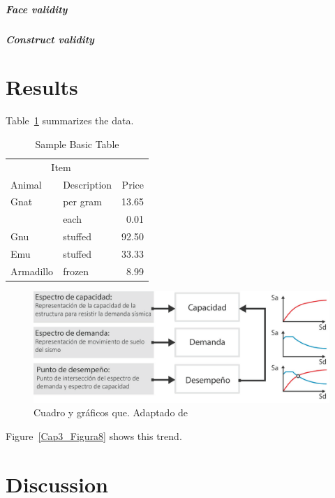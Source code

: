\documentclass[doc, 12pt, a4paper, draftall]{apa7} %
\begin{document}
\subparagraph{Face validity}
\lipsum[13]

\subparagraph{Construct validity}
\lipsum[14]

\section{Results}
Table~\ref{tab:BasicTable} summarizes the data. \lipsum[15]

\begin{table}
  \caption{Sample Basic Table}
  \label{tab:BasicTable}
  \begin{tabular}{@{}llr@{}}         \toprule
  \multicolumn{2}{c}{Item}        \\ \cmidrule(r){1-2}
  Animal    & Description & Price \\ \midrule
  Gnat      & per gram    & 13.65 \\
            & each        &  0.01 \\
  Gnu       & stuffed     & 92.50 \\
  Emu       & stuffed     & 33.33 \\
  Armadillo & frozen      &  8.99 \\ \bottomrule
  \end{tabular}
\end{table}

\begin{figure}[!ht]
	\centering
  \includegraphics[scale=0.36]{E_IMAGENES/3_Capitulo3/Cap3_Imagen70.png}
	\caption{\centering\footnotesize Cuadro y gráficos que. Adaptado de \cite{deWaal2009}}
	\label{Cap3_Figura2}
\end{figure}

Figure~\ref{Cap3_Figura8} shows this trend. \lipsum[16]

\section{Discussion}
\lipsum[17]

\lipsum[18]
\end{document}
